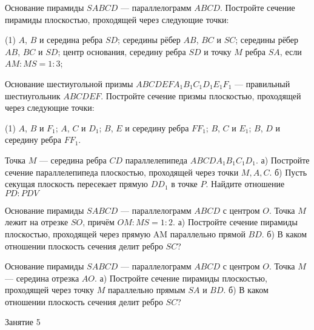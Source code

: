 \begin{class}[number=4]
	\begin{listofex}
		\item Основание пирамиды \( SABCD \) --- параллелограмм \( ABCD \).
		Постройте сечение пирамиды плоскостью, проходящей через следующие
		точки:
		\begin{tasks}(1)
			\task \( A \), \( B \) и середина ребра \( SD \);
			\task середины рёбер \( AB \), \( BC \) и \( SC \);
			\task середины рёбер \( AB \), \( BC \) и \( SD \);
			\task центр основания, середину ребра \( SD \) и точку \( M \) ребра \( SA \),
			если \( AM : MS = 1 : 3 \);
		\end{tasks}
		\item Основание шестиугольной призмы \( ABCDEFA_1B_1C_1D_1E_1F_1 \) ---
		правильный шестиугольник \( ABCDEF \).
		Постройте сечение призмы плоскостью,
		проходящей через следующие точки:
		\begin{tasks}(1)
			\task \( A \), \( B \) и \( F_1 \);
			\task \( A \), \( C \) и \( D_1 \);
			\task \( B \), \( E \) и середину ребра \( FF_1 \);
			\task \( B \), \( C \) и \( E_1 \);
			\task \( B \), \( D \) и середину ребра \( FF_1 \).
		\end{tasks}
		\item Точка \(M\) — середина ребра \(CD\) параллелепипеда \(ABCDA_1B_1C_1D_1\). а) Постройте сечение параллелепипеда плоскостью, проходящей через точки \(M, A, C\). б) Пусть секущая плоскость пересекает прямую \(DD_1\) в точке \(P\). Найдите отношение \(PD:PDV\)
		\item Основание пирамиды \(SABCD\) — параллелограмм \(ABCD\) с центром \(O\). Точка \(M\) лежит на отрезке \(SO\), причём \(OM:MS = 1:2\). а) Постройте сечение пирамиды плоскостью, проходящей через прямую AM параллельно прямой \(BD\). б) В каком отношении плоскость сечения делит ребро \(SC\)?
		\item Основание пирамиды \(SABCD\) — параллелограмм \(ABCD\) с центром \(O\). Точка \(M\) — середина отрезка \(AO\). а) Постройте сечение пирамиды плоскостью, проходящей через точку \(M\) параллельно прямым \(SA\) и \(BD\). б) В каком отношении плоскость сечения делит ребро \(SC\)?
	\end{listofex}
\end{class}

\begin{class}[number=5]
	\begin{listofex}
		\item Занятие 5
	\end{listofex}
\end{class}

